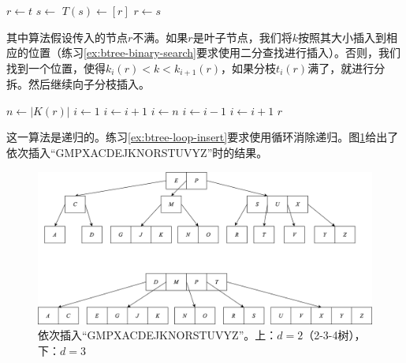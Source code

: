 \documentclass{ctexart}
\begin{document}
\begin{algorithmic}[1]
  \State $r \gets t$
   
    \State $s \gets$ 
    \State $T(s) \gets [ r ]$
    \State {}
    \State $r \gets s$
  \EndIf
  \State \Return {}
\EndFunction
\end{algorithmic}

其中算法假设传入的节点$r$不满。如果$r$是叶子节点，我们将$k$按照其大小插入到相应的位置（练习\ref{ex:btree-binary-search}要求使用二分查找进行插入）。否则，我们找到一个位置，使得$k_i(r) < k < k_{i+1}(r)$，如果分枝$t_i(r)$满了，就进行分拆。然后继续向子分枝插入。

\begin{algorithmic}[1]
  \State $n \gets |K(r)|$
    \State $i \gets 1$
      \State $i \gets i + 1$
    \EndWhile
    \State {}
  \Else
    \State $i \gets n$
      \State $i \gets i - 1$
    \EndWhile
      \State {}
        \State $i \gets i + 1$
      \EndIf
    \EndIf
    \State {}
  \EndIf
  \State \Return $r$
\EndFunction
\end{algorithmic}

这一算法是递归的。练习\ref{ex:btree-loop-insert}要求使用循环消除递归。图\ref{fig:btree-insert}给出了依次插入``GMPXACDEJKNORSTUVYZ''时的结果。

\begin{figure}[htbp]
  \centering
  \includegraphics[scale=0.5]{img/btree-split-insert-example.png}
  \caption{依次插入``GMPXACDEJKNORSTUVYZ''。上：$d = 2$（2-3-4树），下：$d = 3$}
  \label{fig:btree-insert}
\end{figure}
\end{document}
